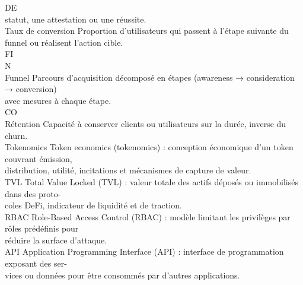 \documentclass[12pt,landscape,a4paper]{article}
\begin{document}
\vspace{0.5em}
DE\\
statut, une attestation ou une réussite.\\
\vspace{0.5em}
Taux de conversion                      Proportion d’utilisateurs qui passent à l’étape suivante du funnel ou réalisent l’action cible.\\
\vspace{0.5em}
\vspace{0.5em}
\vspace{0.5em}
\vspace{0.5em}
FI\\
N\\
Funnel                                  Parcours d’acquisition décomposé en étapes (awareness → consideration → conversion)\\
avec mesures à chaque étape.\\
CO\\
Rétention                               Capacité à conserver clients ou utilisateurs sur la durée, inverse du churn.\\
\vspace{0.5em}
Tokenomics                              Token economics (tokenomics) : conception économique d’un token couvrant émission,\\
distribution, utilité, incitations et mécanismes de capture de valeur.\\
\vspace{0.5em}
TVL                                     Total Value Locked (TVL) : valeur totale des actifs déposés ou immobilisés dans des proto-\\
coles DeFi, indicateur de liquidité et de traction.\\
\vspace{0.5em}
RBAC                                    Role-Based Access Control (RBAC) : modèle limitant les privilèges par rôles prédéfinis pour\\
réduire la surface d’attaque.\\
\vspace{0.5em}
API                                     Application Programming Interface (API) : interface de programmation exposant des ser-\\
vices ou données pour être consommés par d’autres applications.\\
\vspace{0.5em}
\vspace{0.5em}
\vspace{0.5em}
\end{document}
